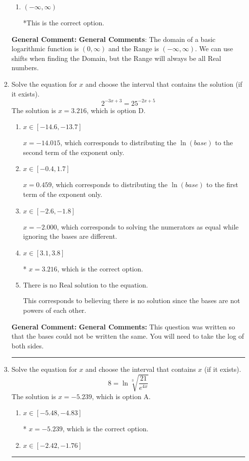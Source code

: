 \documentclass{extbook}[14pt]
\newcommand{\litem}[1]{\item #1

\rule{\textwidth}{0.4pt}}
\begin{document}
\begin{enumerate}
{\begin{enumerate}[label=\Alph*.]
$[-8, \infty)$, which corresponds to using the flipped Domain AND including the endpoint.
\item \( (-\infty, \infty) \)

*This is the correct option.
\end{enumerate}

\textbf{General Comment:} \textbf{General Comments}: The domain of a basic logarithmic function is $(0, \infty)$ and the Range is $(-\infty, \infty)$. We can use shifts when finding the Domain, but the Range will always be all Real numbers.
}
\litem{
Solve the equation for $x$ and choose the interval that contains the solution (if it exists).
\[ 2^{-3x+3} = 25^{-2x+5} \]
The solution is \( x = 3.216 \), which is option D.\begin{enumerate}[label=\Alph*.]
\item \( x \in [-14.6, -13.7] \)

$x = -14.015$, which corresponds to distributing the $\ln(base)$ to the second term of the exponent only.
\item \( x \in [-0.4, 1.7] \)

$x = 0.459$, which corresponds to distributing the $\ln(base)$ to the first term of the exponent only.
\item \( x \in [-2.6, -1.8] \)

$x = -2.000$, which corresponds to solving the numerators as equal while ignoring the bases are different.
\item \( x \in [3.1, 3.8] \)

* $x = 3.216$, which is the correct option.
\item \( \text{There is no Real solution to the equation.} \)

This corresponds to believing there is no solution since the bases are not powers of each other.
\end{enumerate}

\textbf{General Comment:} \textbf{General Comments:} This question was written so that the bases could not be written the same. You will need to take the log of both sides.
}
\litem{
 Solve the equation for $x$ and choose the interval that contains $x$ (if it exists).
\[  8 = \ln{\sqrt[3]{\frac{21}{e^{4x}}}} \]
The solution is \( x = -5.239 \), which is option A.\begin{enumerate}[label=\Alph*.]
\item \( x \in [-5.48, -4.83] \)

* $x = -5.239$, which is the correct option.
\item \( x \in [-2.42, -1.76] \)


\end{enumerate}}
\end{enumerate}
\end{document}
